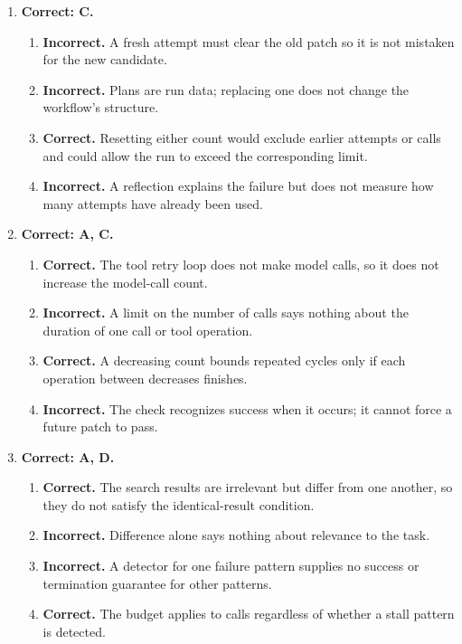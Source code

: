 \begin{enumerate}[start=21,itemsep=0.7\baselineskip]
\item[{\hyperref[exercise:27]{27.}}] \begin{minipage}[t]{\linewidth}
\textbf{Correct: C.}
\begin{enumerate}[label=\textnormal{(\Alph*)},leftmargin=*,itemsep=0pt]
\item \textbf{Incorrect.} A fresh attempt must clear the old patch so it is not mistaken for the new candidate.
\item \textbf{Incorrect.} Plans are run data; replacing one does not change the workflow's structure.
\item \textbf{Correct.} Resetting either count would exclude earlier attempts or calls and could allow the run to exceed the corresponding limit.
\item \textbf{Incorrect.} A reflection explains the failure but does not measure how many attempts have already been used.
\end{enumerate}
\end{minipage}

\item[{\hyperref[exercise:28]{28.}}] \begin{minipage}[t]{\linewidth}
\textbf{Correct: A, C.}
\begin{enumerate}[label=\textnormal{(\Alph*)},leftmargin=*,itemsep=0pt]
\item \textbf{Correct.} The tool retry loop does not make model calls, so it does not increase the model-call count.
\item \textbf{Incorrect.} A limit on the number of calls says nothing about the duration of one call or tool operation.
\item \textbf{Correct.} A decreasing count bounds repeated cycles only if each operation between decreases finishes.
\item \textbf{Incorrect.} The check recognizes success when it occurs; it cannot force a future patch to pass.
\end{enumerate}
\end{minipage}

\item[{\hyperref[exercise:29]{29.}}] \begin{minipage}[t]{\linewidth}
\textbf{Correct: A, D.}
\begin{enumerate}[label=\textnormal{(\Alph*)},leftmargin=*,itemsep=0pt]
\item \textbf{Correct.} The search results are irrelevant but differ from one another, so they do not satisfy the identical-result condition.
\item \textbf{Incorrect.} Difference alone says nothing about relevance to the task.
\item \textbf{Incorrect.} A detector for one failure pattern supplies no success or termination guarantee for other patterns.
\item \textbf{Correct.} The budget applies to calls regardless of whether a stall pattern is detected.
\end{enumerate}
\end{minipage}


\end{enumerate}
